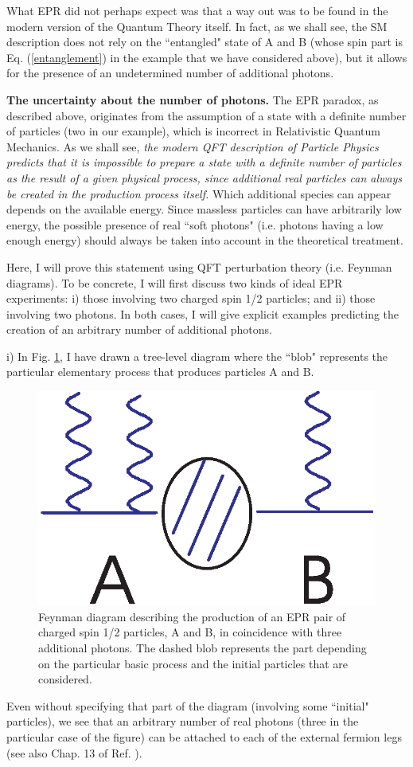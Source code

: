 \documentclass[aps,prl,showkeys,showpacs,preprint,groupedaddress,12pt]{revtex4}
\begin{document}
What EPR did not perhaps expect was that a way out was to be found
in the modern version of the Quantum Theory itself. In fact, as we
shall see, the SM description does not rely on the ``entangled"
state of A and B (whose spin part is Eq. (\ref{entanglement}) in
the example that we have considered above), but it allows for the
presence of an undetermined number of additional photons.

{\bf The uncertainty about the number of photons.} The EPR
paradox, as described above, originates from the assumption of a
state with a definite number of particles (two in our example),
which is incorrect in Relativistic Quantum Mechanics. As we shall
see, {\it the modern QFT description of Particle Physics predicts
that it is impossible to prepare a state with a definite number of
particles as the result of a given physical process, since
additional real particles can always be created in the production
process itself.} Which additional species can appear depends on
the available energy. Since massless particles can have
arbitrarily low energy, the possible presence of real ``soft
photons" (i.e. photons having a low enough energy) should always
be taken into account in the theoretical treatment.

Here, I will prove this statement using QFT perturbation theory
(i.e. Feynman diagrams). To be concrete, I will first discuss two
kinds of ideal EPR experiments: i) those involving two charged
spin 1/2 particles; and ii) those involving two photons. In both
cases, I will give explicit examples predicting the creation of an
arbitrary number of additional photons.

i) In Fig. \ref{fig1}, I have drawn a tree-level diagram where
the ``blob" represents the particular elementary process that
produces particles A and B.
\begin{figure}
\includegraphics{fig1.eps}
\caption{\label{fig1} Feynman diagram describing the production of
an EPR pair of charged spin 1/2 particles, A and B, in coincidence
with three additional photons. The dashed blob represents the part
depending on the particular basic process and the initial
particles that are considered.}
\end{figure}
Even without specifying that part of the diagram (involving some
``initial" particles), we see that an arbitrary number of real
photons (three in the particular case of the figure) can be
attached to each of the external fermion legs (see also Chap. 13
of Ref. \cite{WeinbookI}).
\end{document}

